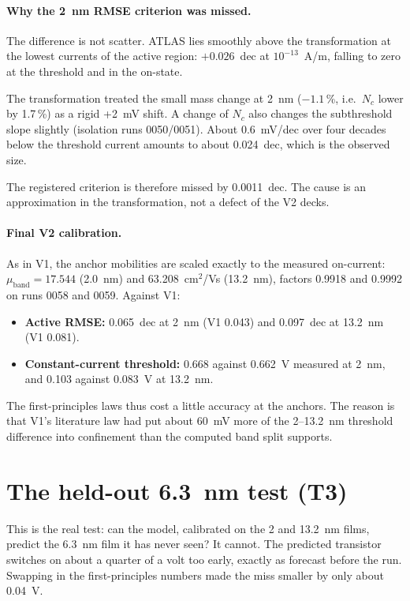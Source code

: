 \paragraph{Why the 2~nm RMSE criterion was missed.} The difference is not scatter. ATLAS lies smoothly above the
transformation at the lowest currents of the active region: $+0.026$~dec at $10^{-13}$~A/\textmu m, falling to zero at
the threshold and in the on-state.

The transformation treated the small mass change at 2~nm ($-1.1$\,\%, i.e.\ $N_c$ lower by 1.7\,\%) as a rigid
+2~mV shift. A change of $N_c$ also changes the subthreshold slope slightly (isolation runs 0050/0051). About
0.6~mV/dec over four decades below the threshold current amounts to about 0.024~dec, which is the observed size.

The registered criterion is therefore missed by 0.0011~dec. The cause is an approximation in the transformation, not
a defect of the V2 decks.

\paragraph{Final V2 calibration.} As in V1, the anchor mobilities are scaled exactly to the measured on-current:
$\mu_{\mathrm{band}} = 17.544$ (2.0~nm) and 63.208~cm$^2$/Vs (13.2~nm), factors 0.9918 and 0.9992 on runs 0058 and
0059. Against V1:
\begin{itemize}
\item \textbf{Active RMSE:} 0.065~dec at 2~nm (V1 0.043) and 0.097~dec at 13.2~nm (V1 0.081).
\item \textbf{Constant-current threshold:} 0.668 against 0.662~V measured at 2~nm, and 0.103 against 0.083~V at
13.2~nm.
\end{itemize}
The first-principles laws thus cost a little accuracy at the anchors. The reason is that V1's literature law had put
about 60~mV more of the 2--13.2~nm threshold difference into confinement than the computed band split supports.

\section{The held-out 6.3~nm test (T3)}
\label{sec:v2-test}

\begin{v2plain}
This is the real test: can the model, calibrated on the 2 and 13.2~nm films, predict the 6.3~nm film it has never
seen? It cannot. The predicted transistor switches on about a quarter of a volt too early, exactly as forecast before
the run. Swapping in the first-principles numbers made the miss smaller by only about 0.04~V.
\end{v2plain}

